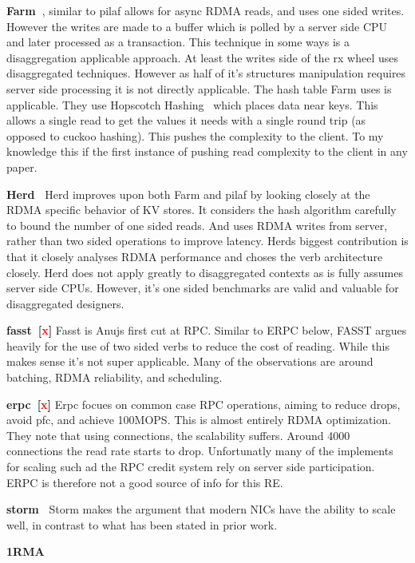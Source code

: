 \textbf{Farm~\cite{farm}}, similar to pilaf allows for async RDMA reads, and
uses one sided writes. However the writes are made to a buffer which is polled
by a server side CPU and later processed as a transaction. This technique in
some ways is a disaggregation applicable approach. At least the writes side of
the rx wheel uses disaggregated techniques. However as half of it's structures
manipulation requires server side processing it is not directly applicable. The
hash table Farm uses is applicable. They use Hopscotch Hashing~\cite{hopscotch}
which places data near keys. This allows a single read to get the values it
needs with a single round trip (as opposed to cuckoo hashing). This pushes the
complexity to the client. To my knowledge this if the first instance of pushing
read complexity to the client in any paper.

\textbf{Herd~\cite{herd}} Herd improves upon both Farm and pilaf by looking
closely at the RDMA specific behavior of KV stores. It considers the hash
algorithm carefully to bound the number of one sided reads. And uses RDMA writes
from server, rather than two sided operations to improve latency. Herds biggest
contribution is that it closely analyses RDMA performance and choses the verb
architecture closely. Herd does not apply greatly to disaggregated contexts as
is fully assumes server side CPUs. However, it's one sided benchmarks are valid
and valuable for disaggregated designers.

\textbf{fasst~\cite{faast}[\textcolor{red}{x}]} Fasst is Anujs first cut at RPC.
Similar to ERPC below, FASST argues heavily for the use of two sided verbs to
reduce the cost of reading. While this makes sense it's not super applicable.
Many of the observations are around batching, RDMA reliability, and scheduling.

\textbf{erpc~\cite{erpc}[\textcolor{red}{x}]} Erpc focues on common case RPC
operations, aiming to reduce drops, avoid pfc, and achieve 100MOPS. This is
almost entirely RDMA optimization. They note that using connections, the
scalability suffers. Around 4000 connections the read rate starts to drop.
Unfortunatly many of the implements for scaling such ad the RPC credit system
rely on server side participation. ERPC is therefore not a good source of info
for this RE.


\textbf{storm~\cite{storm}} Storm makes the argument that modern NICs have the
ability to scale well, in contrast to what has been stated in prior work.

\textbf{1RMA~\cite{1rma}}

